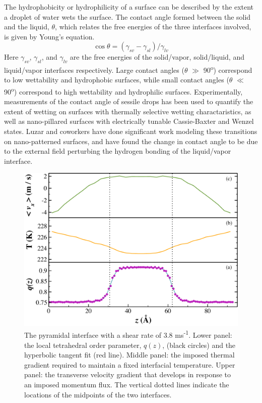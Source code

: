 \documentclass{pnastwo}
\begin{document}
\begin{article}
The hydrophobicity or hydrophilicity of a surface can be described by the
extent a droplet of water wets the surface. The contact angle formed between
the solid and the liquid, $\theta$, which relates the free energies of the 
three interfaces involved, is given by Young's equation.
\begin{equation}\label{young}
\cos\theta = (\gamma_{sv} - \gamma_{sl})/\gamma_{lv}
\end{equation} 
Here $\gamma_{sv}$, $\gamma_{sl}$, and $\gamma_{lv}$ are the free energies
of the solid/vapor, solid/liquid, and liquid/vapor interfaces respectively.
Large contact angles ($\theta$ $\gg$ 90\textsuperscript{o}) correspond to low 
wettability and hydrophobic surfaces, while small contact angles 
($\theta$ $\ll$ 90\textsuperscript{o}) correspond to high wettability and 
hydrophilic surfaces. Experimentally, measurements of the contact angle
of sessile drops has been used to quantify the extent of wetting on surfaces
with thermally selective wetting charactaristics\cite{Tadanaga00,Liu04,Sun04},
as well as nano-pillared surfaces with electrically tunable Cassie-Baxter and 
Wenzel states\cite{Herbertson06,Dhindsa06,Verplanck07,Ahuja08,Manukyan11}. 
Luzar and coworkers have done significant work modeling these transitions on 
nano-patterned surfaces\cite{Daub07,Daub10,Daub11,Ritchie12}, and have found 
the change in contact angle to be due to the external field perturbing the 
hydrogen bonding of the liquid/vapor interface\cite{Daub07}.



\end{article}

\begin{figure}
\includegraphics[width=\linewidth]{Pyr_comic_strip}
\caption{\label{fig:pyrComic} The pyramidal interface with a shear
 rate of 3.8 ms\textsuperscript{-1}. Lower panel: the local tetrahedral order
parameter, $q(z)$, (black circles) and the hyperbolic tangent fit (red line).
Middle panel: the imposed thermal gradient required to maintain a fixed
interfacial temperature. Upper panel: the transverse velocity gradient that
develops in response to an imposed momentum flux. The vertical dotted lines
indicate the locations of the midpoints of the two interfaces.}
\end{figure}
\end{document}
